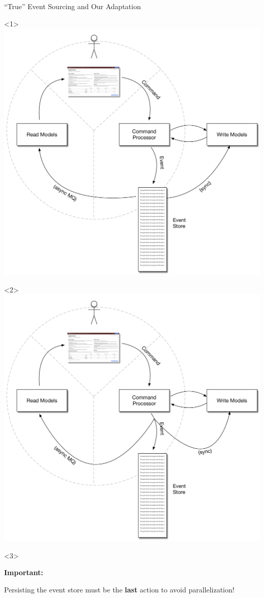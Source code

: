 \begin{frame}[fragile]{``True'' Event Sourcing and Our Adaptation}

\begin{center}

\begin{onlyenv}<1>
\includegraphics[width=.7\textwidth]{../EventSourcing4.pdf}
\end{onlyenv}

\begin{onlyenv}<2>
\includegraphics[width=.7\textwidth]{../EventSourcingOurStyle.pdf}
\end{onlyenv}


\begin{onlyenv}<3>

\textbf{Important:}

\vspace{4em}
Persisting the event store must be the \textbf{last} action to avoid parallelization!
\end{onlyenv}

\end{center}

\end{frame}

